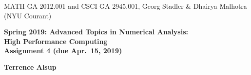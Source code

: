 \documentclass[12pt]{article}
\begin{document}
\begin{center}
  \vspace*{-2cm}
{\small MATH-GA 2012.001 and CSCI-GA 2945.001, Georg Stadler \&
  Dhairya Malhotra (NYU Courant)}
\end{center}
\vspace*{.5cm}
\begin{center}
\large \textbf{%
Spring 2019: Advanced Topics in Numerical Analysis: \\
High Performance Computing \\
Assignment 4 (due Apr.\ 15, 2019) }
\end{center}

\vspace*{0.4cm}
\begin{center}
\large \textbf{Terrence Alsup}
\end{center}

\vspace*{0.25cm}


\vspace*{0.25cm}
\end{document}
